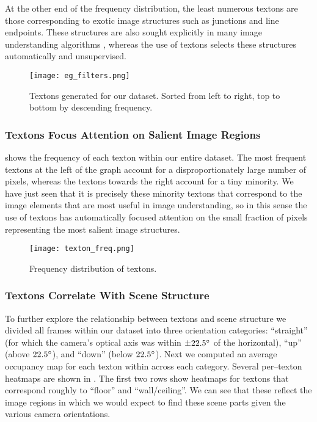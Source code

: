 At the other end of the frequency distribution, the least numerous
textons are those corresponding to exotic image structures such as
junctions and line endpoints. These structures are also sought
explicitly in many image understanding algorithms \cite{Forsyth02},
whereas the use of textons selects these structures automatically and
unsupervised.

\begin{figure}[htp]
\centering
\texttt{[image: eg\_filters.png]}
\caption{Textons generated for our dataset. Sorted from left to right,
  top to bottom by descending frequency.}
\label{fig:textons-generated}
\end{figure}

\subsubsection{Textons Focus Attention on Salient Image Regions}
 shows the frequency of each texton within
our entire dataset. The most frequent textons at the left of the graph
account for a disproportionately large number of pixels, whereas the
textons towards the right account for a tiny minority. We have just
seen that it is precisely these minority textons that correspond to
the image elements that are most useful in image understanding, so in
this sense the use of textons has automatically focused attention on
the small fraction of pixels representing the most salient image
structures.

\begin{figure}[htp]
\centering
\texttt{[image: texton\_freq.png]}
\caption{Frequency distribution of textons.}
\label{fig:texton-freq-distr}
\end{figure}

\subsubsection{Textons Correlate With Scene Structure}
To further explore the relationship between textons and scene
structure we divided all frames within our dataset into three
orientation categories: ``straight'' (for which the camera's optical
axis was within $\pm 22.5\degrees$ of the horizontal), ``up'' (above
$22.5\degrees$), and ``down'' (below $22.5\degrees$). Next we computed
an average occupancy map for each texton within across each
category. Several per--texton heatmaps are shown in
. The first two rows show heatmaps for textons that
correspond roughly to ``floor'' and ``wall/ceiling''. We can see that
these reflect the image regions in which we would expect to find these
scene parts given the various camera orientations.

